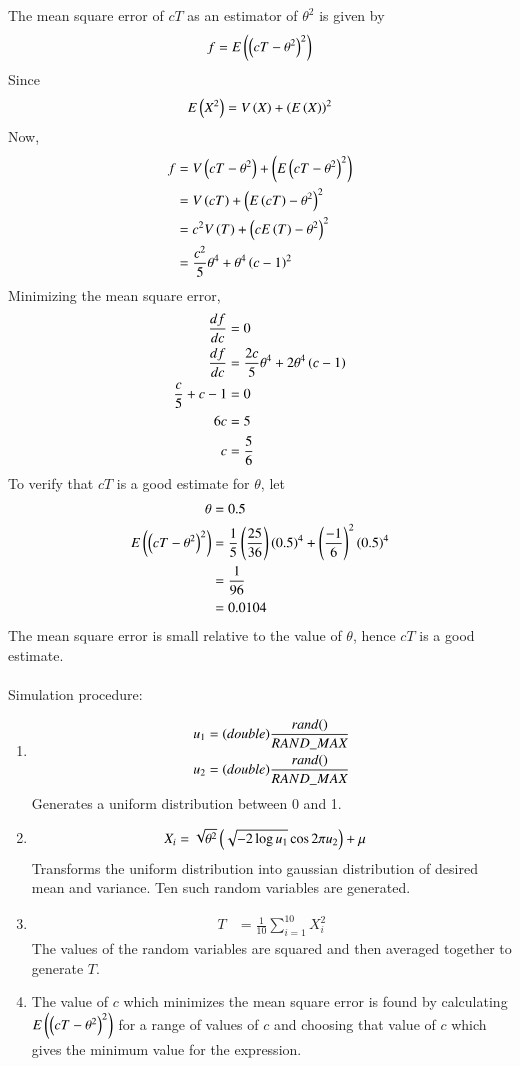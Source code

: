 \documentclass[journal,12pt,onecolumn]{IEEEtran}
\theoremstyle{remark}
\begin{document}
The mean square error of $cT$ as an estimator of $\theta^2$ is given by
\begin{align}
	f = E\left(\left(cT - \theta^2\right)^2\right)
\end{align}
Since
\begin{align}
	E\left(X^2\right) = V\left(X\right) + \left(E\left(X\right)\right)^2
\end{align}
Now,
\begin{align}
	f &= V\left(cT - \theta^2\right) + \left(E\left(cT - \theta^2\right)^2\right)\\
	&= V\left(cT\right) + \left(E\left(cT\right) - \theta^2\right)^2\\
	&= c^2V\left(T\right) + \left(cE\left(T\right) - \theta^2\right)^2\\
	&= \frac{c^2}{5}\theta^4 + \theta^4\left(c-1\right)^2
\end{align}
Minimizing the mean square error,
\begin{align}
	\frac{df}{dc} &= 0\\
	\frac{df}{dc} &= \frac{2c}{5}\theta^4 + 2\theta^4\left(c-1\right)\\
	\frac{c}{5} + c - 1 &= 0\\
	6c &= 5\\
	c &= \frac{5}{6}
\end{align}
To verify that $cT$ is a good estimate for $\theta$, let
\begin{align}
	\theta &= 0.5\\
	E\left(\left(cT - \theta^2\right)^2\right) &= \frac{1}{5}\left(\frac{25}{36}\right)\left(0.5\right)^4 + \left(\frac{-1}{6}\right)^2\left(0.5\right)^4\\
	&= \frac{1}{96}\\
	&= 0.0104
\end{align}
The mean square error is small relative to the value of $\theta$, hence $cT$ is a good estimate.
\\
\\
Simulation procedure:
\begin{enumerate}[label = (\roman*)]
	\item \begin{align}
	u_1 &= (double) \frac{rand()}{RAND\_MAX} \vspace{2pt} \\
	u_2 &= (double) \frac{rand()}{RAND\_MAX}
	\end{align}
	Generates a uniform distribution between 0 and 1.
	\item \begin{align}
	 X_i &= \sqrt{\theta^2}\left(\sqrt{-2\log{u_1}} \cos{2\pi u_2}\right) + \mu
	 \end{align}
	 Transforms the uniform distribution into gaussian distribution of desired mean and variance. Ten such random variables are generated.
	\item \begin{align}
	T &= \frac{1}{10}\sum^{10}_{i=1}{X_i^2}
	\end{align} 
	The values of the random variables are squared and then averaged together to generate $T$.
	\item The value of $c$ which minimizes the mean square error is found by calculating $E\left(\left(cT - \theta^2\right)^2\right)$ for a range of values of $c$ and choosing that value of $c$ which gives the minimum value for the expression.
\end{enumerate}
\end{document}
